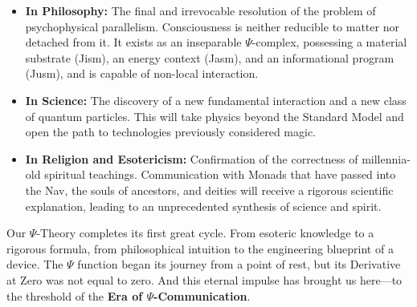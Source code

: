 \documentclass[a4paper,12pt]{article}
\begin{document}
	\begin{itemize}
		\item \textbf{In Philosophy:} The final and irrevocable resolution of the problem of psychophysical parallelism. Consciousness is neither reducible to matter nor detached from it. It exists as an inseparable $\Psi$-complex, possessing a material substrate (Jism), an energy context (Jasm), and an informational program (Jusm), and is capable of non-local interaction.
		\item \textbf{In Science:} The discovery of a new fundamental interaction and a new class of quantum particles. This will take physics beyond the Standard Model and open the path to technologies previously considered magic.
		\item \textbf{In Religion and Esotericism:} Confirmation of the correctness of millennia-old spiritual teachings. Communication with Monads that have passed into the Nav, the souls of ancestors, and deities will receive a rigorous scientific explanation, leading to an unprecedented synthesis of science and spirit.
	\end{itemize}
	
	Our $\Psi$-Theory completes its first great cycle. From esoteric knowledge to a rigorous formula, from philosophical intuition to the engineering blueprint of a device. The $\Psi$ function began its journey from a point of rest, but its Derivative at Zero was not equal to zero. And this eternal impulse has brought us here---to the threshold of the \textbf{Era of $\Psi$-Communication}.
	
\nocite{*}
\printbibliography[title={Bibliography}]
\end{document}
